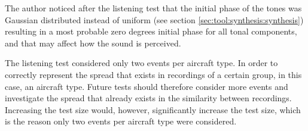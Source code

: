 The author noticed after the listening test that the initial phase of the tones
was Gaussian distributed instead of uniform (see section
\ref{sec:tool:synthesis:synthesis}) resulting in a most probable zero degrees
initial phase for all tonal components, and that may affect how the sound is
perceived.

The listening test considered only two events per aircraft type. In order to
correctly represent the spread that exists in recordings of a certain group, in
this case, an aircraft type. Future tests should therefore consider more events
and investigate the spread that already exists in the similarity between
recordings. Increasing the test size would, however, significantly increase the
test size, which is the reason only two events per aircraft type were
considered.
